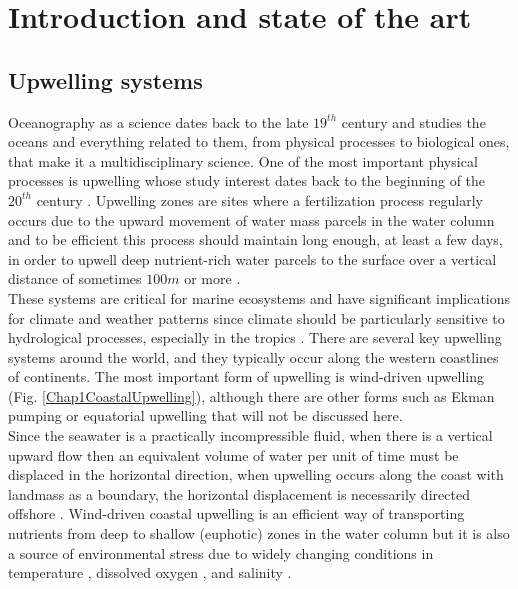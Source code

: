 \chapter{Introduction and state of the art}\label{Chap1}

\clearpage
\section{Upwelling systems}\label{Chap1UpweSyst}

Oceanography as a science dates back to the late $19^{th}$ century \citep{Wust1964,Mill2012,LlopCowe2014} and studies the oceans and everything related to them, from physical processes to biological ones, that make it a multidisciplinary science. One of the most important physical processes is upwelling whose study interest dates back to the beginning of the $20^{th}$ century \citep{Ogil1912,Murp1920}. Upwelling zones are sites where a fertilization process regularly occurs due to the upward movement of water mass parcels in the water column and to be efficient this process should maintain long enough, at least a few days, in order to upwell deep nutrient-rich water parcels to the surface over a vertical distance of sometimes $100 m$ or more \citep{Marg1978}.\\

These systems are critical for marine ecosystems and have significant implications for climate and weather patterns since climate should be particularly sensitive to hydrological processes, especially in the tropics \citep{Webs1994}. There are several key upwelling systems around the world, and they typically occur along the western coastlines of continents. The most important form of upwelling is wind-driven upwelling (Fig. \ref{Chap1CoastalUpwelling}), although there are other forms such as Ekman pumping or equatorial upwelling that will not be discussed here.\\

Since the seawater is a practically incompressible fluid, when there is a vertical upward flow then an equivalent volume of water per unit of time must be displaced in the horizontal direction, when upwelling occurs along the coast with landmass as a boundary, the horizontal displacement is necessarily directed offshore \citep{KampCap2}. Wind-driven coastal upwelling is an efficient way of transporting nutrients from deep to shallow (euphotic) zones in the water column \citep{MessChav2015,MessChav2017} but it is also a source of environmental stress due to widely changing conditions in temperature \citep{CastWang2014}, dissolved oxygen \citep{Scul2010}, and salinity \citep{XuanHuan2012}.\\

